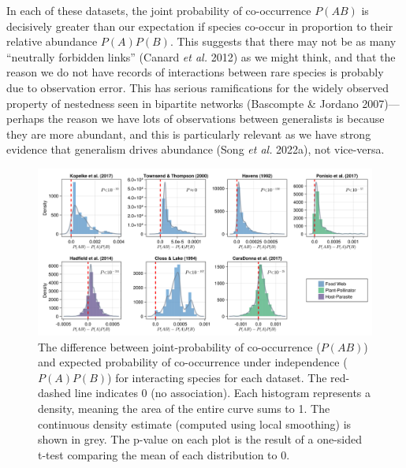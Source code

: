 \documentclass[11pt]{article}
\makeatletter
\def\maxwidth{\ifdim\Gin@nat@width>\linewidth\linewidth
\else\Gin@nat@width\fi}
\let\Oldincludegraphics\includegraphics
\renewcommand{\includegraphics}[1]{\Oldincludegraphics[width=\maxwidth]{#1}}
\makeatother
\begin{document}
In each of these datasets, the joint probability of co-occurrence
\(P(AB)\) is decisively greater than our expectation if species co-occur
in proportion to their relative abundance \(P(A)P(B)\). This suggests
that there may not be as many ``neutrally forbidden links'' (Canard
\emph{et al.} 2012) as we might think, and that the reason we do not
have records of interactions between rare species is probably due to
observation error. This has serious ramifications for the widely
observed property of nestedness seen in bipartite networks (Bascompte \&
Jordano 2007)---perhaps the reason we have lots of observations between
generalists is because they are more abundant, and this is particularly
relevant as we have strong evidence that generalism drives abundance
(Song \emph{et al.} 2022a), not vice-versa.

\begin{figure}
\hypertarget{fig:mangal}{%
\centering
\includegraphics{./figures/fig2.png}
\caption{The difference between joint-probability of co-occurrence
(\(P(AB)\)) and expected probability of co-occurrence under independence
(\(P(A)P(B)\)) for interacting species for each dataset. The red-dashed
line indicates 0 (no association). Each histogram represents a density,
meaning the area of the entire curve sums to 1. The continuous density
estimate (computed using local smoothing) is shown in grey. The p-value
on each plot is the result of a one-sided t-test comparing the mean of
each distribution to 0.}\label{fig:mangal}
}
\end{figure}
\end{document}
